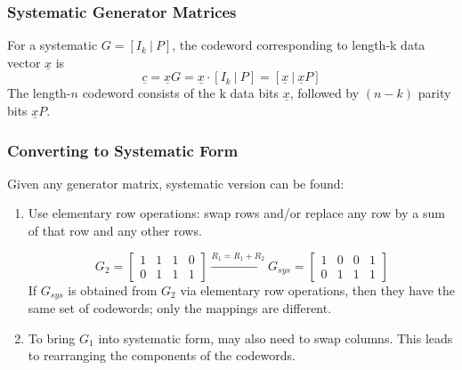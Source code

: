 \documentclass[12pt]{article}
\begin{document}
\subsubsection{Systematic Generator Matrices}
For a systematic $G = \left[ I_k \: | \: P\right]$, the codeword corresponding to length-k data vector $\underline{x}$ is 
\[
\underline{c} = \underline{x}G = \underline{x} \cdot \left[ I_k \: | \: P\right] = \left[ \underline{x} \: | \: \underline{x}P\right]
\]
The length-$n$ codeword consists of the k data bits $\underline{x}$, followed by $(n-k)$ parity bits $\underline{x}P$.

\subsubsection{Converting to Systematic Form}
Given any generator matrix, systematic version can be found:
\begin{enumerate}
    \item Use elementary row operations: swap rows and/or replace any row by a sum of that row and any other rows.

    \[
    G_2 = \begin{bmatrix}
    1&1&1&0\\
    0&1&1&1
    \end{bmatrix}
    \xrightarrow[]{R_1=R_1+R_2}
    G_{sys} = \begin{bmatrix}
    1&0&0&1 \\
    0&1&1&1
    \end{bmatrix}
    \]
    If $G_{sys}$ is obtained from $G_2$ via elementary row operations, then they have the same set of codewords; only the mappings are different.
    \item To bring $G_1$ into systematic form, may also need to swap columns. This leads to rearranging the components of the codewords.
\end{enumerate}
\end{document}
